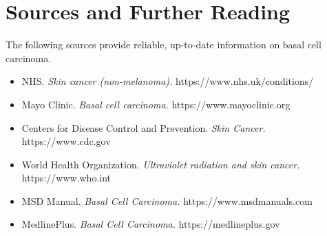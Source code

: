 \section*{Sources and Further Reading}
The following sources provide reliable, up-to-date information on basal cell carcinoma.
\begin{itemize}
    \item NHS. \textit{Skin cancer (non-melanoma).} https://www.nhs.uk/conditions/
    \item Mayo Clinic. \textit{Basal cell carcinoma.} https://www.mayoclinic.org
    \item Centers for Disease Control and Prevention. \textit{Skin Cancer.} https://www.cdc.gov
    \item World Health Organization. \textit{Ultraviolet radiation and skin cancer.} https://www.who.int
    \item MSD Manual. \textit{Basal Cell Carcinoma.} https://www.msdmanuals.com
    \item MedlinePlus. \textit{Basal Cell Carcinoma.} https://medlineplus.gov
\end{itemize}
